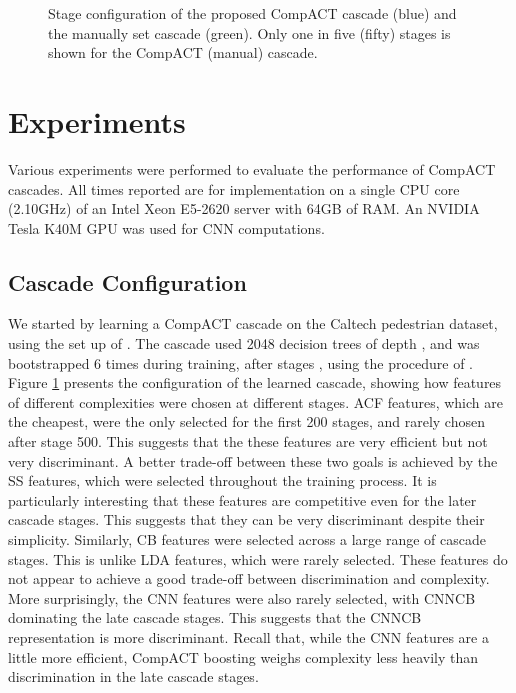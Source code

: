 \documentclass[10pt,twocolumn,letterpaper]{article}
\begin{document}
\begin{figure}[!t]
\centering
\centerline{}
\caption{Stage configuration of the proposed CompACT cascade (blue) and
the manually set cascade (green). Only one in five (fifty) stages is shown
for the CompACT (manual) cascade.}
\label{fig:stages}
\end{figure}

\section{Experiments}

Various experiments were performed to evaluate the performance of CompACT
cascades. All times reported are for implementation on a
single CPU core (2.10GHz) of an Intel Xeon E5-2620 server with 64GB of
RAM. An NVIDIA Tesla K40M GPU was used for CNN computations.


\subsection{Cascade Configuration}
\label{subsec:configuration}

We started by learning a CompACT cascade on the Caltech pedestrian dataset,
using the set up of \cite{DBLP:journals/pami/DollarABP14}.
The cascade used 2048 decision trees of depth , and
was bootstrapped 6 times during training, after stages
, using the procedure of
\cite{DBLP:conf/cvpr/GallL09,DBLP:conf/bmvc/TangLK12}.
Figure \ref{fig:stages} presents the
configuration of the learned cascade, showing how features of different
complexities were chosen at different stages. ACF features, which are the
cheapest, were the only selected for the first 200 stages,
and rarely chosen after stage 500. This suggests that the these features
are very efficient but not very discriminant. A better trade-off between
these two goals is achieved by the SS features,
which were selected throughout the training process. It is particularly
interesting that these features are competitive even for the later
cascade stages. This suggests that they can be very discriminant
despite their simplicity. Similarly, CB features were selected across
a large range of cascade stages. This is unlike LDA features,
which were rarely selected. These features do not appear to achieve a
good trade-off between discrimination and complexity. More surprisingly,
the CNN features were also rarely selected, with CNNCB dominating the late
cascade stages. This suggests that the CNNCB representation is more
discriminant. Recall that, while the CNN features are a little more efficient,
CompACT boosting weighs complexity less heavily than discrimination in
the late cascade stages.
\end{document}
